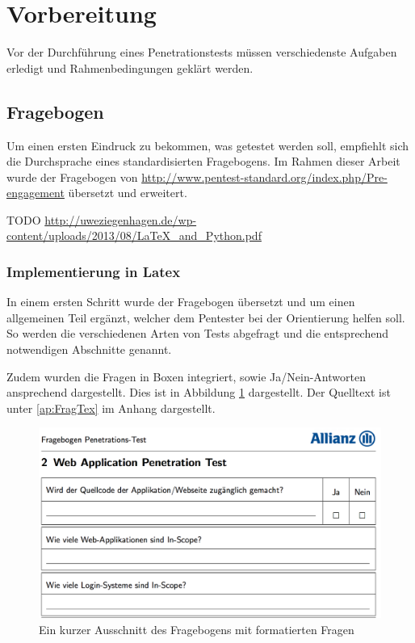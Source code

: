 \section{Vorbereitung}
Vor der Durchführung eines Penetrationstests müssen verschiedenste Aufgaben erledigt und Rahmenbedingungen geklärt werden.

\subsection{Fragebogen}
Um einen ersten Eindruck zu bekommen, was getestet werden soll, empfiehlt sich die Durchsprache eines standardisierten Fragebogens. Im Rahmen dieser Arbeit wurde der Fragebogen von \url{http://www.pentest-standard.org/index.php/Pre-engagement} übersetzt und erweitert.

TODO
\url{http://uweziegenhagen.de/wp-content/uploads/2013/08/LaTeX_and_Python.pdf}

\subsubsection{Implementierung in Latex}
In einem ersten Schritt wurde der Fragebogen übersetzt und um einen allgemeinen Teil ergänzt, welcher dem Pentester bei der Orientierung helfen soll. So werden die verschiedenen Arten von Tests abgefragt und die entsprechend notwendigen Abschnitte genannt.

Zudem wurden die Fragen in Boxen integriert, sowie Ja/Nein-Antworten ansprechend dargestellt. Dies ist in Abbildung \ref{fig:FragLatex} dargestellt. Der Quelltext ist unter \ref{ap:FragTex} im Anhang dargestellt.

\begin{figure}[htbp]
	\centering
	\includegraphics[width=\textwidth]{bilder/pentest_prozesse/vorbereitung/fragebogen_latex.png}
	\caption{Ein kurzer Ausschnitt des Fragebogens mit formatierten Fragen}
	\label{fig:FragLatex}
\end{figure}



